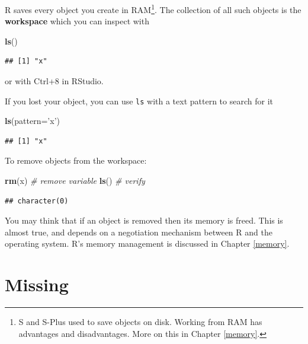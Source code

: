 \documentclass[]{book}
\newenvironment{Shaded}{\begin{snugshade}}{\end{snugshade}}
\newcommand{\CommentTok}[1]{\textcolor[rgb]{0.56,0.35,0.01}{\textit{#1}}}
\newcommand{\DataTypeTok}[1]{\textcolor[rgb]{0.13,0.29,0.53}{#1}}
\newcommand{\KeywordTok}[1]{\textcolor[rgb]{0.13,0.29,0.53}{\textbf{#1}}}
\newcommand{\NormalTok}[1]{#1}
\newcommand{\StringTok}[1]{\textcolor[rgb]{0.31,0.60,0.02}{#1}}
\theoremstyle{definition}
\theoremstyle{definition}
\theoremstyle{definition}
\theoremstyle{remark}
\begin{document}
R saves every object you create in RAM\footnote{S and S-Plus used to save objects on disk. Working from RAM has advantages and disadvantages. More on this in Chapter \ref{memory}.}.
The collection of all such objects is the \textbf{workspace} which you can inspect with

\begin{Shaded}
\begin{Highlighting}[]
\KeywordTok{ls}\NormalTok{()}
\end{Highlighting}
\end{Shaded}

\begin{verbatim}
## [1] "x"
\end{verbatim}

or with Ctrl+8 in RStudio.

If you lost your object, you can use \texttt{ls} with a text pattern to search for it

\begin{Shaded}
\begin{Highlighting}[]
\KeywordTok{ls}\NormalTok{(}\DataTypeTok{pattern=}\StringTok{'x'}\NormalTok{)}
\end{Highlighting}
\end{Shaded}

\begin{verbatim}
## [1] "x"
\end{verbatim}

To remove objects from the workspace:

\begin{Shaded}
\begin{Highlighting}[]
\KeywordTok{rm}\NormalTok{(x) }\CommentTok{# remove variable}
\KeywordTok{ls}\NormalTok{() }\CommentTok{# verify}
\end{Highlighting}
\end{Shaded}

\begin{verbatim}
## character(0)
\end{verbatim}

You may think that if an object is removed then its memory is freed.
This is almost true, and depends on a negotiation mechanism between R and the operating system.
R's memory management is discussed in Chapter \ref{memory}.

\hypertarget{missing}{%
\section{Missing}\label{missing}}
\end{document}

